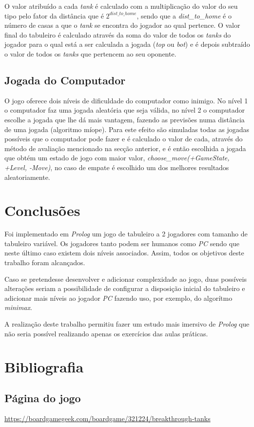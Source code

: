 \documentclass[a4paper,11pt,portuguese]{article}
\begin{document}
    O valor atribuído a cada \textit{tank} é calculado com a multiplicação do valor do seu tipo
    pelo fator da distância que é $ 2^{dist\_to\_home} $, sendo que a \textit{dist\_to\_home}
    é o número de casas a que o \textit{tank} se encontra do jogador ao qual pertence.
    O valor final do tabuleiro é calculado através da soma do valor de todos os \textit{tanks}
    do jogador para o qual está a ser calculada a jogada (\textit{top} ou \textit{bot}) e é
    depois subtraído o valor de todos os \textit{tanks} que pertencem ao seu oponente.


    \subsection{Jogada do Computador}

    O jogo oferece dois níveis de dificuldade do computador como inimigo.
    No nível 1 o computador faz uma jogada aleatória que seja válida, no nível 2
    o computador escolhe a jogada que lhe dá mais vantagem, fazendo as previsões
    numa distância de uma jogada (algoritmo míope). Para este efeito são simuladas todas
    as jogadas possíveis que o computador pode fazer e é calculado o valor de cada, através 
    do método de avaliação mencionado na secção anterior, e é então escolhida a jogada que obtém 
    um estado de jogo com maior valor, \textit{choose\_move(+GameState, +Level, -Move)}, no
    caso de empate é escolhido um dos melhores resultados aleatoriamente. 



\section{Conclusões}

Foi implementado em \textit{Prolog} um jogo de tabuleiro a 2 jogadores com tamanho de tabuleiro
variável. Os jogadores tanto podem ser humanos como \textit{PC} sendo que neste último caso
existem dois níveis associados. Assim, todos os objetivos deste trabalho foram alcançados. \par

Caso se pretendesse desenvolver e adicionar complexidade ao jogo, duas possíveis alterações
seriam a possibilidade de configurar a disposição inicial do tabuleiro e adicionar mais níveis
ao jogador \textit{PC} fazendo uso, por exemplo, do algorítmo \textit{minimax}. \par

A realização deste trabalho permitiu fazer um estudo mais imersivo de \textit{Prolog} que não
seria possível realizando apenas os exercícios das aulas práticas.


\section{Bibliografia}

\subsection{Página do jogo}
\href{https://boardgamegeek.com/boardgame/321224/breakthrough-tanks}{https://boardgamegeek.com/boardgame/321224/breakthrough-tanks}
\end{document}
